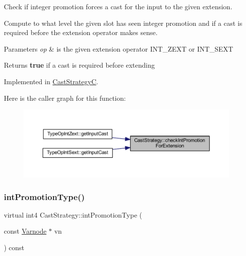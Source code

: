Check if integer promotion forces a cast for the input to the given extension. 

Compute to what level the given slot has seen integer promotion and if a cast is required before the extension operator makes sense. 
\begin{DoxyParams}{Parameters}
{\em op} & is the given extension operator I\+N\+T\+\_\+\+Z\+E\+XT or I\+N\+T\+\_\+\+S\+E\+XT \\
\hline
\end{DoxyParams}
\begin{DoxyReturn}{Returns}
{\bfseries{true}} if a cast is required before extending 
\end{DoxyReturn}


Implemented in \mbox{\hyperlink{class_cast_strategy_c_a567cf30b699d20f9652e0edb437a5994}{Cast\+StrategyC}}.

Here is the caller graph for this function\+:
\nopagebreak
\begin{figure}[H]
\begin{center}
\leavevmode
\includegraphics[width=350pt]{class_cast_strategy_a1d44ad4691a30115228ae37533d2c38d_icgraph}
\end{center}
\end{figure}
\mbox{\label{class_cast_strategy_a69b81cbe074f60bf95bd8823e7bf191c}} 
\subsubsection{\texorpdfstring{intPromotionType()}{intPromotionType()}}
{\footnotesize\ttfamily virtual int4 Cast\+Strategy\+::int\+Promotion\+Type (\begin{DoxyParamCaption}\item[{const \mbox{\hyperlink{class_varnode}{Varnode}} $\ast$}]{vn }\end{DoxyParamCaption}) const\hspace{0.3cm}{\ttfamily [pure virtual]}}



